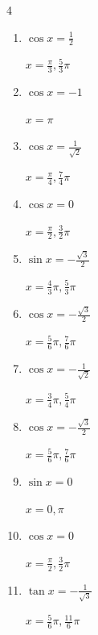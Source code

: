 \begin{multicols}{4}
\begin{enumerate}
        $\displaystyle x = \frac{\pi}{3} , \frac{5}{3}\pi$

  \item $\displaystyle \cos{x}  = \frac{1}{2}$

        $\displaystyle x = \frac{\pi}{3} , \frac{5}{3}\pi$

  \item $\displaystyle \cos{x}  = -1$

        $\displaystyle x = \pi$

  \item $\displaystyle \cos{x}  = \frac{1}{\sqrt{2}}$

        $\displaystyle x = \frac{\pi}{4} , \frac{7}{4}\pi$

\columnbreak %

  \item $\displaystyle \cos{x}  = 0$

        $\displaystyle x = \frac{\pi}{2} , \frac{3}{2}\pi$

  \item $\displaystyle \sin{x}  = -\frac{\sqrt{3}}{2}$

        $\displaystyle x = \frac{4}{3}\pi , \frac{5}{3}\pi$

  \item $\displaystyle \cos{x}  = -\frac{\sqrt{3}}{2}$

        $\displaystyle x = \frac{5}{6}\pi , \frac{7}{6}\pi$

  \item $\displaystyle \cos{x}  = -\frac{1}{\sqrt{2}}$

        $\displaystyle x = \frac{3}{4}\pi , \frac{5}{4}\pi$

  \item $\displaystyle \cos{x}  = -\frac{\sqrt{3}}{2}$

        $\displaystyle x = \frac{5}{6}\pi , \frac{7}{6}\pi$

  \item $\displaystyle \sin{x}  = 0$

        $\displaystyle x = 0 , \pi$

  \item $\displaystyle \cos{x}  = 0$

        $\displaystyle x = \frac{\pi}{2} , \frac{3}{2}\pi$

  \item $\displaystyle \tan{x}  = -\frac{1}{\sqrt{3}}$

        $\displaystyle x = \frac{5}{6}\pi , \frac{11}{6}\pi$


\end{enumerate}
\end{multicols}
